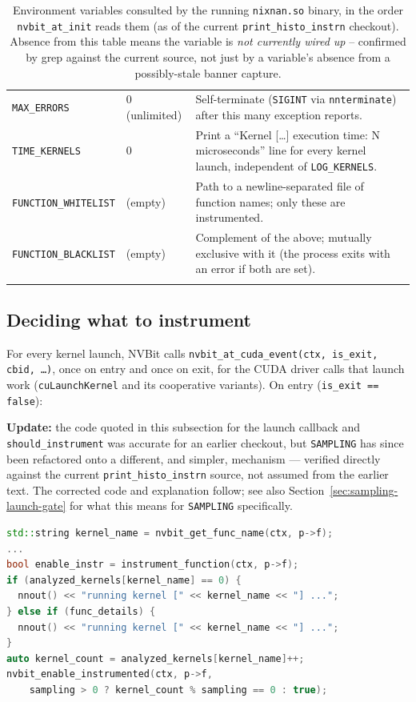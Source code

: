 \documentclass[11pt]{article}
\begin{document}
\begin{longtable}{p{3.2cm}p{2.3cm}p{8.2cm}}
\texttt{MAX\_ERRORS} & 0 (unlimited) & Self-terminate (\texttt{SIGINT} via \texttt{nnterminate}) after this many exception reports. \\
\texttt{TIME\_KERNELS} & 0 & Print a ``Kernel [\ldots] execution time: N microseconds'' line for every kernel launch, independent of \texttt{LOG\_KERNELS}. \\
\texttt{FUNCTION\_WHITELIST} & (empty) & Path to a newline-separated file of function names; only these are instrumented. \\
\texttt{FUNCTION\_BLACKLIST} & (empty) & Complement of the above; mutually exclusive with it (the process exits with an error if both are set). \\
\bottomrule
\caption{Environment variables consulted by the running \texttt{nixnan.so} binary, in the order \texttt{nvbit\_at\_init} reads them (as of the current \texttt{print\_histo\_instrn} checkout). Absence from this table means the variable is \emph{not currently wired up} -- confirmed by grep against the current source, not just by a variable's absence from a possibly-stale banner capture.}
\label{tab:envvars}
\end{longtable}

\subsection{Deciding what to instrument}

For every kernel launch, NVBit calls
\texttt{nvbit\_at\_cuda\_event(ctx, is\_exit, cbid, \ldots)}, once on entry
and once on exit, for the CUDA driver calls that launch work
(\texttt{cuLaunchKernel} and its cooperative variants). On entry
(\texttt{is\_exit == false}):

\textbf{Update:} the code quoted in this subsection for the launch
callback and \texttt{should\_instrument} was accurate for an earlier
checkout, but \texttt{SAMPLING} has since been refactored onto a
different, and simpler, mechanism --- verified directly against the
current \texttt{print\_histo\_instrn} source, not assumed from the
earlier text. The corrected code and explanation follow; see also
Section~\ref{sec:sampling-launch-gate} for what this means for
\texttt{SAMPLING} specifically.

\begin{lstlisting}[language=C++]
std::string kernel_name = nvbit_get_func_name(ctx, p->f);
...
bool enable_instr = instrument_function(ctx, p->f);
if (analyzed_kernels[kernel_name] == 0) {
  nnout() << "running kernel [" << kernel_name << "] ...";
} else if (func_details) {
  nnout() << "running kernel [" << kernel_name << "] ...";
}
auto kernel_count = analyzed_kernels[kernel_name]++;
nvbit_enable_instrumented(ctx, p->f,
    sampling > 0 ? kernel_count % sampling == 0 : true);
\end{lstlisting}
\end{document}
